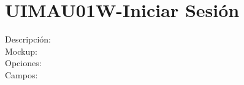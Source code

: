 
\section{UIMAU01W-Iniciar Sesión}
\begin{description}
	\item[Descripción:]
	
	\item[Mockup:]\hspace{1pt}
	
	\item[Opciones:]
	
	\item[Campos:]

\end{description}